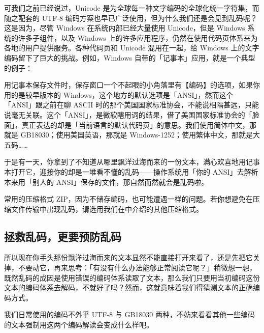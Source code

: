 可我们之前已经说过，Unicode 是为全球每一种文字编码的全球化统一字符集，而随之配套的 UTF-8 编码方案也早已广泛使用，但为什么我们还是会见到乱码呢？这是因为，尽管 Windows 在系统内部已经大量使用 Unicode，但是 Windows 系统的许多子组件，以及 Windows 上的许多应用程序，仍然在使用代码页体系来为各地的用户提供服务。各种代码页和 Unicode 混用在一起，给 Windows 上的文字编码留下了巨大的挑战。例如，Windows 自带的「记事本」应用，就是一个典型的例子：

用记事本保存文件时，保存窗口一个不起眼的小角落里有【编码】的选项，如果你用的是较早版本的 Windows，这个地方的默认选项是「ANSI」，然而这个「ANSI」跟之前在聊 ASCII 时的那个美国国家标准协会，不能说相隔甚远，只能说毫无关联。这个「ANSI」，是微软瞎用词的结果，借了美国国家标准协会的「脸面」，真正表达的却是「当前语言的默认代码页」的意思。我们使用简体中文，那就是 GB18030；使用美国英语，那就是 Windows-1252；使用繁体中文，那就是大五码……

于是有一天，你拿到了不知道从哪里飘洋过海而来的一份文本，满心欢喜地用记事本打开它，迎接你的却是一堆看不懂的乱码——操作系统用「你的 ANSI」去解析本来用「别人的 ANSI」保存的文件，那自然而然就会是乱码啦。

\begin{note}
  常用的压缩格式 ZIP，因为不储存编码，也可能遭遇一样的问题。若你想避免在压缩文件传输中出现乱码，请选用我们在中介绍的其他压缩格式。
\end{note}

\subsection{拯救乱码，更要预防乱码}

所以现在你手头那份飘洋过海而来的文本显然不能直接打开来看了，还是先把它关掉，不要动它，再来思考：「有没有什么办法能够正常阅读它呢？」稍微想一想，既然乱码的成因是使用错误的编码体系读取了文本，那么我们只要用当初编码这份文本的编码体系去解码，不就好了吗？然而，这就意味着我们得猜测文本的正确编码方式。

我们日常使用的编码不外乎 UTF-8 与 GB18030 两种，不妨来看看其他一些编码的文本强制用这两个编码解读会变成什么样吧。


